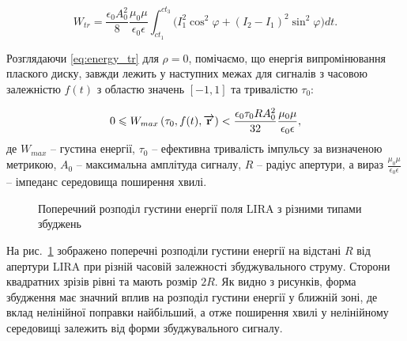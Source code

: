 %
\begin{equation} \label{eq:energy_tr}
W_{tr} = \frac{\epsilon_0 A_0^2}{8} \frac{\mu_0 \mu}{\epsilon_0 \epsilon}
\int_{ct_1}^{ct_3}  \Big( I_1^2 \cos^2 \varphi + 
\left( I_2 - I_1 \right)^2 \sin^2 \varphi \Big) dt.
\end{equation}

Розглядаючи \ref{eq:energy_tr} для $ \rho = 0 $, помічаємо, що енергія 
випромінювання плаского диску, завжди лежить у наступних межах для 
сигналів з часовою залежністю $ f(t) $ з областю значень 
$ \left[ -1, 1 \right] $ та тривалістю $ \tau_0 $:

%
%
\begin{equation}
0 \leqslant W_{max} \left( \tau_0, f(t), \overrightarrow{\mathbf r} \right) < 
\frac{\epsilon_0 \tau_0 R A_0^2}{32} \frac{\mu_0 \mu}{\epsilon_0 \epsilon},
\end{equation}
%
де $ W_{max} $ -- густина енергії, $ \tau_0 $ -- ефективна тривалість імпульсу 
за визначеною метрикою, $ A_0 $ -- максимальна амплітуда сигналу, $ R $ -- 
радіус апертури, а вираз $ \frac{\mu_0 \mu}{\epsilon_0 \epsilon} $ -- імпеданс 
середовища поширення хвилі.

\begin{figure}
\caption{Поперечний розподіл густини енергії поля LIRA з різними типами збуджень}
\label{fig:trans_dist}
\end{figure}

На рис.~\ref{fig:trans_dist} зображено поперечні розподіли густини енергії на 
відстані $ R $ від апертури LIRA при різній часовій залежності збуджувального 
струму. Сторони квадратних зрізів рівні та мають розмір $ 2R $. Як видно з 
рисунків, форма збудження має значний вплив на розподіл густини енергії у 
ближній зоні, де вклад нелінійної поправки найбільший, а отже поширення хвилі 
у нелінійному середовищі залежить від форми збуджувального сигналу.

